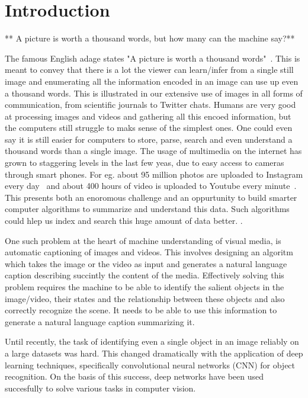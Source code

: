 \chapter{Introduction}
\label{chapter:intro}
** A picture is worth a thousand words, but how many can the machine say?**

The famous English adage states "A picture is worth a thousand
words"~\cite{ThousandQuote}. This is meant to convey that there is a lot the
viewer can learn/infer from a single still image and enumerating all the
information encoded in an image can use up even a thousand words. This is
illustrated in our extensive use of images in all forms of communication, from
scientific journals to Twitter chats. 
%
Humans are very good at processing images and videos and gathering all this
encoed information, but the computers still struggle to maks sense of the
simplest ones.
%
One could even say it is still easier for computers to store, parse, search and
even understand a thousand words than a single image.
%
The usage of multimedia on the internet has grown to staggering levels in the
last few yeas, due to easy access to cameras through smart phones. For eg. about
95 million photos are uploaded to Instagram every day~\cite{InstStats} and about
400 hours of video is uploaded to Youtube every minute~\cite{YouStats}. This
presents both an enoromous challenge and an oppurtunity to build smarter
computer algorithms to summarize and understand this data. Such algorithms could
hlep us index and search this huge amount of data better. .
%

One such problem at the heart of machine understanding of visual media, is
automatic captioning of images and videos. This involves designing an algoritm
which takes the image or the video as input and generates a natural language
caption describing succintly the content of the media. Effectively solving this
problem requires the machine to be able to identify the salient objects in the
image/video, their states and the relationship between these objects and also
correctly recognize the scene. It needs to be able to use this information to
generate a natural language caption summarizing it.

Until recently, the task of identifying even a single object in an image
reliably on a large datasets was hard. This changed dramatically with the
application of deep learning techniques, specifically convolutional neural
networks (CNN) for object recognition. On the basis of this success, deep
networks have been used succesfully to solve various tasks in computer vision.

